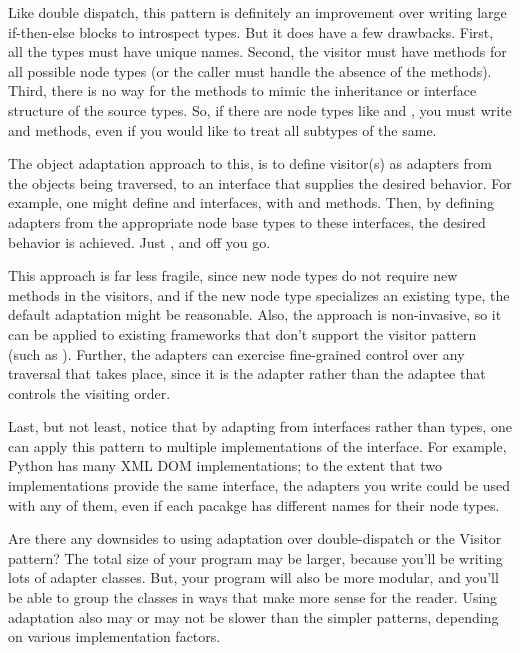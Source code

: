 \begin{verbatim%
}
\begin{verbatim%
}
\begin{verbatim%
}
\begin{verbatim%
}
\begin{verbatim%
}
\begin{verbatim%
}
\begin{verbatim%
}
\begin{verbatim%
}
\begin{verbatim%
}
\begin{verbatim%
}
\begin{verbatim%
}
\begin{verbatim%
}
\begin{verbatim%
}
\begin{verbatim%
}
Like double dispatch, this pattern is definitely an improvement over writing
large if-then-else blocks to introspect types.  But it does have a few
drawbacks.  First, all the types must have unique names.  Second, the visitor
must have methods for all possible node types (or the caller must handle the
absence of the methods).  Third, there is no way for the methods to mimic the
inheritance or interface structure of the source types.  So, if there are node
types like  and , you must write 
and  methods, even if you would like to treat all subtypes
of  the same.

The object adaptation approach to this, is to define visitor(s) as adapters from
the objects being traversed, to an interface that supplies the desired behavior.
For example, one might define  and 
interfaces, with  and  methods.  Then, by
defining adapters from the appropriate node base types to these interfaces, the
desired behavior is achieved.  Just
, and off you go.

This approach is far less fragile, since new node types do not require new
methods in the visitors, and if the new node type specializes an existing type,
the default adaptation might be reasonable.  Also, the approach is non-invasive,
so it can be applied to existing frameworks that don't support the visitor
pattern (such as ).  Further, the adapters can exercise
fine-grained control over any traversal that takes place, since it is the
adapter rather than the adaptee that controls the visiting order.





Last, but not least, notice that by adapting from interfaces rather than
types, one can apply this pattern to multiple implementations of the interface.
For example, Python has many XML DOM implementations; to the extent that two
implementations provide the same interface, the adapters you write could be used
with any of them, even if each pacakge has different names for their node types.

Are there any downsides to using adaptation over double-dispatch or the Visitor
pattern?  The total size of your program may be larger, because you'll be
writing lots of adapter classes.  But, your program will also be more modular,
and you'll be able to group the classes in ways that make more sense for the
reader.  Using adaptation also may or may not be slower than the simpler
patterns, depending on various implementation factors.


\end{verbatim%
}
\end{verbatim%
}
\end{verbatim%
}
\end{verbatim%
}
\end{verbatim%
}
\end{verbatim%
}
\end{verbatim%
}
\end{verbatim%
}
\end{verbatim%
}
\end{verbatim%
}
\end{verbatim%
}
\end{verbatim%
}
\end{verbatim%
}
\end{verbatim%
}
